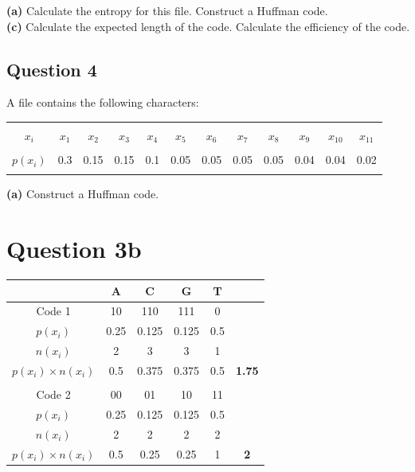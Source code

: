 \documentclass[a4paper,12pt]{article}
\begin{document}
{\bf(a)} Calculate the entropy for this file.  Construct a Huffman code. \quad \\{\bf(c)} Calculate the expected length of the code.  Calculate the efficiency of the code.




\subsection*{Question 4}

A file contains the following characters:\\[-0.1cm]
\begin{center}
	\begin{tabular}{|c|ccccccccccc|}
		\hline
		&&&&&&&&&&& \\[-0.4cm]
		$x_i$     & $x_1$ & $x_2$ & $x_3$ & $x_4$ & $x_5$ & $x_6$ & $x_7$  & $x_8$ & $x_9$  & $x_{10}$ & $x_{11}$ \\[0.1cm]
		\hline
		&&&&&&&&&&& \\[-0.4cm]
		$p(x_i)$  & 0.3 & 0.15 & 0.15 & 0.1 & 0.05 & 0.05 & 0.05 & 0.05 & 0.04 & 0.04 & 0.02 \\[0.1cm]
		\hline
		\multicolumn{12}{c}{}\\[-0.2cm]
	\end{tabular}
\end{center}

{\bf(a)} Construct a Huffman code.
\newpage
\section*{Question 3b}
\begin{center}
\begin{tabular}{|c|c|c|c|c|c|}
\hline 
	&	A	&	C	&	G	&	T	&		\\ \hline	
Code 1	&	10	&	110	&	111	&	0	&		\\ \hline	
$p(x_i)$	&	0.25	&	0.125	&	0.125	&	0.5	&		\\ \hline	
$n(x_i)$	&	2	&	3	&	3	&	1	&		\\ \hline	
$p(x_i) \times n(x_i)$	&	0.5	&	0.375	&	0.375	&	0.5	&	\textbf{1.75}	\\ \hline	
	&		&		&		&		&		\\ \hline	\hline
Code 2	&	00	&	01	&	10	&	11	&		\\ \hline	
$p(x_i)$	&	0.25	&	0.125	&	0.125	&	0.5	&		\\ \hline	
$n(x_i)$	&	2	&	2	&	2	&	2	&		\\ \hline	
$p(x_i) \times n(x_i)$	&	0.5	&	0.25	&	0.25	&	1	&	\textbf{2}	\\ \hline	
\end{tabular} 
\end{center}
\end{document}
